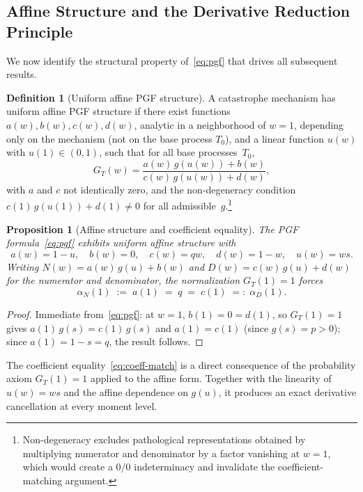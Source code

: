 \documentclass[11pt]{article}
\theoremstyle{plain}
\newtheorem{proposition}[theorem]{Proposition}
\theoremstyle{definition}
\newtheorem{definition}[theorem]{Definition}
\theoremstyle{remark}
\begin{document}
\subsection{Affine Structure and the Derivative Reduction Principle}\label{sec:affine}

We now identify the structural property of~\eqref{eq:pgf} that drives all subsequent results.

\begin{definition}[Uniform affine PGF structure]\label{def:affine}
A catastrophe mechanism has uniform affine PGF structure if there exist functions
\(a(w),b(w),c(w),d(w)\), analytic in a neighborhood of \(w=1\), depending only on the mechanism
(not on the base process \(T_0\)), and a linear function \(u(w)\) with \(u(1)\in(0,1)\), such that for all base processes~$T_0$,
\[
  G_T(w) = \frac{a(w)\,g(u(w)) + b(w)}{c(w)\,g(u(w)) + d(w)},
\]
with $a$ and $c$ not identically zero, and the non-degeneracy condition $c(1)\,g(u(1)) + d(1) \neq 0$ for all admissible~$g$.\label{rem:nondegen}\footnote{Non-degeneracy excludes pathological representations obtained by multiplying numerator and denominator by a factor vanishing at $w = 1$, which would create a $0/0$ indeterminacy and invalidate the coefficient-matching argument.}
\end{definition}

\begin{proposition}[Affine structure and coefficient equality]\label{prop:affine}
The PGF formula~\eqref{eq:pgf} exhibits uniform affine structure with
\[
  a(w) = 1-u, \quad b(w) = 0, \quad c(w) = qw, \quad d(w) = 1-w, \quad u(w) = ws.
\]
Writing $N(w) = a(w)\,g(u) + b(w)$ and $D(w) = c(w)\,g(u) + d(w)$ for the numerator and denominator, the normalization $G_T(1) = 1$ forces
\begin{equation}\label{eq:coeff-match}
  \alpha_N(1) \;:=\; a(1) \;=\; q \;=\; c(1) \;=:\; \alpha_D(1).
\end{equation}
\end{proposition}



\begin{proof}
Immediate from~\eqref{eq:pgf}:  at $w = 1$, $b(1) = 0 = d(1)$, so $G_T(1) = 1$ gives $a(1)\,g(s) = c(1)\,g(s)$ and $a(1) = c(1)$ (since $g(s) = p > 0$); since $a(1) = 1-s = q$, the result follows.
\end{proof}

The coefficient equality~\eqref{eq:coeff-match} is a direct consequence of the probability axiom $G_T(1) = 1$ applied to the affine form.  Together with the linearity of $u(w) = ws$ and the affine dependence on $g(u)$, it produces an exact derivative cancellation at every moment level.
\end{document}
